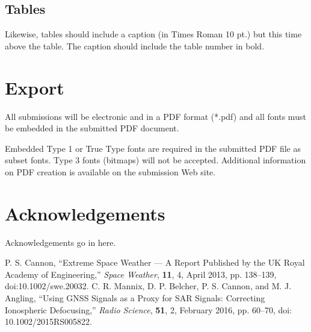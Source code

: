 \documentclass[summary]{ursi}
\begin{document}
\subsection{Tables}

Likewise, tables should include a caption (in Times Roman 10 pt.) but this
time above the table. The caption should include the table number in bold.

\section{Export}
All submissions will be electronic and in a PDF format (*.pdf) and all
fonts must be embedded in the submitted PDF document.

Embedded Type 1 or True Type fonts are required in the submitted PDF file
as subset fonts. Type 3 fonts (bitmaps) will not be accepted. Additional
information on PDF creation is available on the submission Web site.

\section*{Acknowledgements}

Acknowledgements go in here.

\begin{thebibliography}{99}
 P. S. Cannon, ``Extreme Space Weather --- A Report
  Published by the UK Royal Academy of Engineering,'' \emph{Space Weather},
  \textbf{11}, 4, April 2013, pp. 138--139, doi:10.1002/swe.20032.
 C. R. Mannix, D. P. Belcher, P. S. Cannon, and
  M. J. Angling, ``Using GNSS Signals as a Proxy for SAR Signals:
  Correcting Ionospheric Defocusing,'' \emph{Radio Science}, \textbf{51},
  2, February 2016, pp. 60--70, doi: 10.1002/2015RS005822.
\end{thebibliography}
\end{document}
